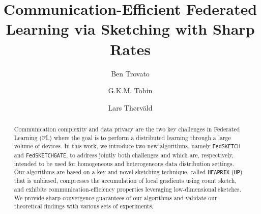 \documentclass[sigconf, anonymous, review]{acmart}
\begin{document}
\title{Communication-Efficient Federated Learning via Sketching with Sharp Rates}


\author{Ben Trovato}
\author{G.K.M. Tobin}
\authornotemark[1]

\author{Lars Th{\o}rv{\"a}ld}

\renewcommand{\shortauthors}{Trovato and Tobin, et al.}

\begin{abstract}
Communication complexity and data privacy are the two key challenges in Federated Learning (FL) where the goal is to perform a distributed learning through a large volume of devices. In this work, we introduce two new algorithms, namely \texttt{FedSKETCH} and \texttt{FedSKETCHGATE}, to address jointly both challenges and which are, respectively, intended to be used for homogeneous and heterogeneous data distribution settings. Our algorithms are based on a key and novel sketching technique, called \texttt{HEAPRIX} (\texttt{HP}) that is unbiased, compresses the accumulation of local gradients using count sketch, and exhibits communication-efficiency properties leveraging low-dimensional sketches. We provide sharp convergence guarantees of our algorithms and validate our theoretical findings with various sets of experiments. 
\end{abstract}
\end{document}
